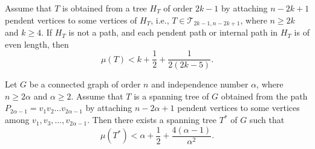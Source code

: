 \documentclass[10pt,a4paper]{amsart}
\begin{document}
\begin{Lemma} \label{le-extra}
Assume that $T$ is obtained from a tree $H_T$ of order $2k-1$ by attaching $n-2k+1$ pendent vertices to some vertices of $H_T$, i.e., $T \in \mathcal{T}_{2k-1,n-2k+1}$, where $n \ge 2k$ and $k \ge 4$. If $H_T$ is not a path, and each pendent path or internal path in $H_T$ is of even length,  then
$$
\mu (T) < k + \frac{1}{2} + \frac{1}{2(2k-5)}.
$$
\end{Lemma}

\begin{Lemma} \label{le-key}
Let $G$ be a connected graph of order $n$ and independence number $\alpha$, where $n \ge 2 \alpha$ and $\alpha \ge 2$. Assume that $T$ is a spanning tree of $G$ obtained from the path $P_{2\alpha-1} = v_1 v_2 \dots v_{2\alpha-1}$ by attaching $n - 2\alpha + 1$ pendent vertices to some vertices among $v_1, v_3, \dots, v_{2\alpha-1}$.
Then there exists a spanning tree $T^*$ of $G$ such that
$$
\mu(T^*) < \alpha + \frac{1}{2} + \frac{4(\alpha-1)}{\alpha^2}.
$$
\end{Lemma}
\end{document}
